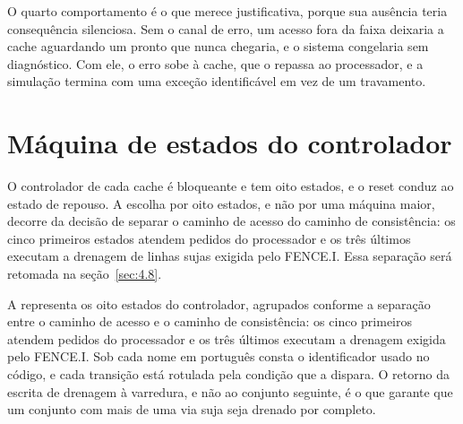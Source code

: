 O quarto comportamento é o que merece justificativa, porque sua ausência teria consequência silenciosa. Sem o canal de erro, um acesso fora da faixa deixaria a cache aguardando um pronto que nunca chegaria, e o sistema congelaria sem diagnóstico. Com ele, o erro sobe à cache, que o repassa ao processador, e a simulação termina com uma exceção identificável em vez de um travamento.

\section{Máquina de estados do controlador}\label{sec:4.6}

O controlador de cada cache é bloqueante e tem oito estados, e o reset conduz ao estado de repouso. A escolha por oito estados, e não por uma máquina maior, decorre da decisão de separar o caminho de acesso do caminho de consistência: os cinco primeiros estados atendem pedidos do processador e os três últimos executam a drenagem de linhas sujas exigida pelo FENCE.I. Essa separação será retomada na seção~\ref{sec:4.8}.

A  representa os oito estados do controlador, agrupados conforme a separação entre o caminho de acesso e o caminho de consistência: os cinco primeiros atendem pedidos do processador e os três últimos executam a drenagem exigida pelo FENCE.I. Sob cada nome em português consta o identificador usado no código, e cada transição está rotulada pela condição que a dispara. O retorno da escrita de drenagem à varredura, e não ao conjunto seguinte, é o que garante que um conjunto com mais de uma via suja seja drenado por completo.


